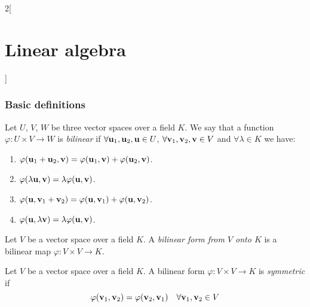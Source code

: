 \documentclass[../../../main.tex]{subfiles}
\begin{document}
\begin{multicols}{2}[\section{Linear algebra}]
  \subsubsection{Basic definitions}
  \begin{definition}
    Let $U$, $V$, $W$ be three vector spaces over a field $K$. We say that a function $\varphi:U\times V\rightarrow W$ is \textit{bilinear} if $\forall\boldsymbol{\mathrm{u}}_1,\boldsymbol{\mathrm{u}}_2,\boldsymbol{\mathrm{u}}\in U$, $\forall \boldsymbol{\mathrm{v}}_1,\boldsymbol{\mathrm{v}}_2,\boldsymbol{\mathrm{v}}\in V$ and $\forall\lambda\in K$ we have:
    \begin{enumerate}
      \item $\varphi(\boldsymbol{\mathrm{u}}_1+\boldsymbol{\mathrm{u}}_2,\boldsymbol{\mathrm{v}})=\varphi(\boldsymbol{\mathrm{u}}_1,\boldsymbol{\mathrm{v}})+\varphi(\boldsymbol{\mathrm{u}}_2,\boldsymbol{\mathrm{v}})$.
      \item $\varphi(\lambda \boldsymbol{\mathrm{u}},\boldsymbol{\mathrm{v}})=\lambda \varphi(\boldsymbol{\mathrm{u}},\boldsymbol{\mathrm{v}})$.
      \item $\varphi(\boldsymbol{\mathrm{u}},\boldsymbol{\mathrm{v}}_1+\boldsymbol{\mathrm{v}}_2)=\varphi(\boldsymbol{\mathrm{u}},\boldsymbol{\mathrm{v}}_1)+\varphi(\boldsymbol{\mathrm{u}},\boldsymbol{\mathrm{v}}_2)$.
      \item $\varphi(\boldsymbol{\mathrm{u}},\lambda \boldsymbol{\mathrm{v}})=\lambda \varphi(\boldsymbol{\mathrm{u}},\boldsymbol{\mathrm{v}})$.
    \end{enumerate}
  \end{definition}
  \begin{definition}
    Let $V$ be a vector space over a field $K$. A \textit{bilinear form from $V$ onto $K$} is a bilinear map $\varphi:V\times V\rightarrow K$.
  \end{definition}
  \begin{definition}
    Let $V$ be a vector space over a field $K$. A bilinear form $\varphi:V\times V\rightarrow K$ is \textit{symmetric} if $$\varphi(\boldsymbol{\mathrm{v}}_1,\boldsymbol{\mathrm{v}}_2)=\varphi(\boldsymbol{\mathrm{v}}_2,\boldsymbol{\mathrm{v}}_1)\quad\forall \boldsymbol{\mathrm{v}}_1,\boldsymbol{\mathrm{v}}_2\in V$$
  \end{definition}

\end{multicols}
\end{document}
